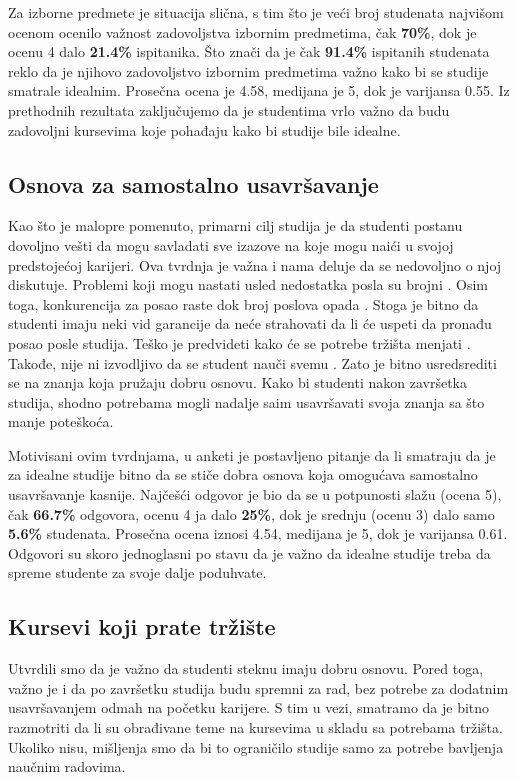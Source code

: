 \documentclass[a4paper]{article}
\begin{document}
{Za izborne predmete je situacija slična, s tim što je veći broj studenata najvišom ocenom ocenilo važnost zadovoljstva izbornim predmetima, čak \textbf{70\%}, dok je ocenu 4 dalo \textbf{21.4\%} ispitanika. Što znači da je čak \textbf{91.4\%} ispitanih studenata reklo da je njihovo zadovoljstvo izbornim predmetima važno kako bi se studije smatrale idealnim. Prosečna ocena je 4.58, medijana je 5, dok je varijansa 0.55. Iz prethodnih rezultata zaključujemo da je studentima vrlo važno da budu zadovoljni kursevima koje pohađaju kako bi studije bile idealne.


\subsection{Osnova za samostalno usavršavanje}
\label{subsec:usavršavanje_stavovi}
Kao što je malopre pomenuto, primarni cilj studija je da studenti postanu dovoljno vešti da mogu savladati sve izazove na koje mogu naići u svojoj predstojećoj karijeri. Ova tvrdnja je važna i nama deluje da se nedovoljno o njoj diskutuje. Problemi koji mogu nastati usled nedostatka posla su brojni \cite{job_lacking}. Osim toga, konkurencija za posao raste dok broj poslova opada \cite{job_competiton}. Stoga je bitno da studenti imaju neki vid garancije da neće strahovati da li će uspeti da pronađu posao posle studija.
Teško je predvideti kako će se potrebe tržišta menjati \cite{job_prediction}. Takođe, nije ni izvodljivo da se student nauči svemu \cite{learn_everything}. Zato je bitno usredsrediti se na znanja koja pružaju dobru osnovu. Kako bi studenti nakon završetka studija, shodno potrebama mogli nadalje saim usavršavati svoja znanja sa što manje poteškoća.

Motivisani ovim tvrdnjama, u anketi je postavljeno pitanje da li smatraju da je za idealne studije bitno da se stiče dobra osnova koja omogućava samostalno usavršavanje kasnije. Najčešći odgovor je bio da se u potpunosti slažu (ocena 5), čak \textbf{66.7\%} odgovora, ocenu 4 ja dalo \textbf{25\%}, dok je srednju (ocenu 3) dalo samo \textbf{5.6\%} studenata. Prosečna ocena iznosi 4.54, medijana je 5, dok je varijansa 0.61. Odgovori su skoro jednoglasni po stavu da je važno da idealne studije treba da spreme studente za svoje dalje poduhvate. 

\subsection{Kursevi koji prate tržište}
\label{subsec:tržište_stavovi}
Utvrdili smo da je važno da studenti steknu imaju dobru osnovu. Pored toga, važno je i da po završetku studija budu spremni za rad, bez potrebe za dodatnim usavršavanjem odmah na početku karijere.
S tim u vezi, smatramo da je bitno razmotriti da li su obrađivane teme na kursevima u skladu sa potrebama tržišta. Ukoliko nisu, mišljenja smo da bi to ograničilo studije samo za potrebe bavljenja naučnim radovima.

}
\end{document}
